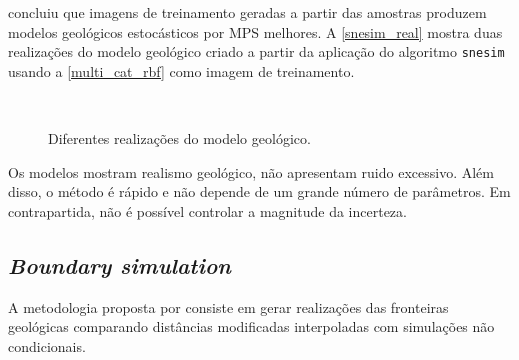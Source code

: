  concluiu que imagens de treinamento geradas a partir das amostras produzem modelos geológicos estocásticos por MPS melhores. A \autoref{snesim_real} mostra duas realizações do modelo geológico criado a partir da aplicação do algoritmo \verb|snesim| usando a \autoref{multi_cat_rbf} como imagem de treinamento. 

\begin{figure}[H]
\caption{Diferentes realizações do modelo geológico.} 
\label{snesim_real}
\begin{center}
\\
\end{center}
\begin{center}
\end{center}
\end{figure}

Os modelos mostram realismo geológico, não apresentam ruido excessivo. Além disso, o método é rápido e não depende de um grande número de parâmetros. Em contrapartida, não é possível controlar a magnitude da incerteza. 

\subsection{\textit{Boundary simulation}}\label{boundsim}

A metodologia proposta por  consiste em gerar realizações das fronteiras geológicas comparando distâncias modificadas interpoladas com simulações não condicionais. 

